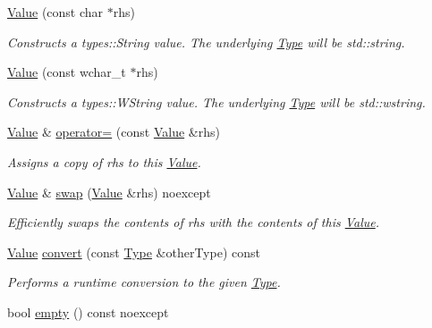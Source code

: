 \begin{DoxyCompactItemize}
\hyperlink{classdg_1_1deepcore_1_1_value_a733f4876448cb2442efb1f1154fea11c}{Value} (const char $\ast$rhs)
\begin{DoxyCompactList}\small\item\em Constructs a types\+::\+String value. The underlying \hyperlink{classdg_1_1deepcore_1_1_type}{Type} will be {\ttfamily std\+::string}. \end{DoxyCompactList}\item 
\hyperlink{classdg_1_1deepcore_1_1_value_a43a4547c1f33ea4377062762ee2b9faa}{Value} (const wchar\+\_\+t $\ast$rhs)
\begin{DoxyCompactList}\small\item\em Constructs a types\+::\+W\+String value. The underlying \hyperlink{classdg_1_1deepcore_1_1_type}{Type} will be {\ttfamily std\+::wstring}. \end{DoxyCompactList}\item 
\hyperlink{classdg_1_1deepcore_1_1_value}{Value} \& \hyperlink{classdg_1_1deepcore_1_1_value_a06cc7185dc287f51702b697e45fe3a02}{operator=} (const \hyperlink{classdg_1_1deepcore_1_1_value}{Value} \&rhs)
\begin{DoxyCompactList}\small\item\em Assigns a copy of {\ttfamily rhs} to this \hyperlink{classdg_1_1deepcore_1_1_value}{Value}. \end{DoxyCompactList}\item 
\hyperlink{classdg_1_1deepcore_1_1_value}{Value} \& \hyperlink{classdg_1_1deepcore_1_1_value_a20c26cb69d292ba88d4da1416928b9d7}{swap} (\hyperlink{classdg_1_1deepcore_1_1_value}{Value} \&rhs) noexcept
\begin{DoxyCompactList}\small\item\em Efficiently swaps the contents of {\ttfamily rhs} with the contents of this \hyperlink{classdg_1_1deepcore_1_1_value}{Value}. \end{DoxyCompactList}\item 
\hyperlink{classdg_1_1deepcore_1_1_value}{Value} \hyperlink{classdg_1_1deepcore_1_1_value_a6d83ae09d57445540a6df97387287c7d}{convert} (const \hyperlink{classdg_1_1deepcore_1_1_type}{Type} \&other\+Type) const 
\begin{DoxyCompactList}\small\item\em Performs a runtime conversion to the given \hyperlink{classdg_1_1deepcore_1_1_type}{Type}. \end{DoxyCompactList}\item 
bool \hyperlink{classdg_1_1deepcore_1_1_value_a1f42a0fe1931c1cd31550d557b2003a1}{empty} () const noexcept

\end{DoxyCompactItemize}
